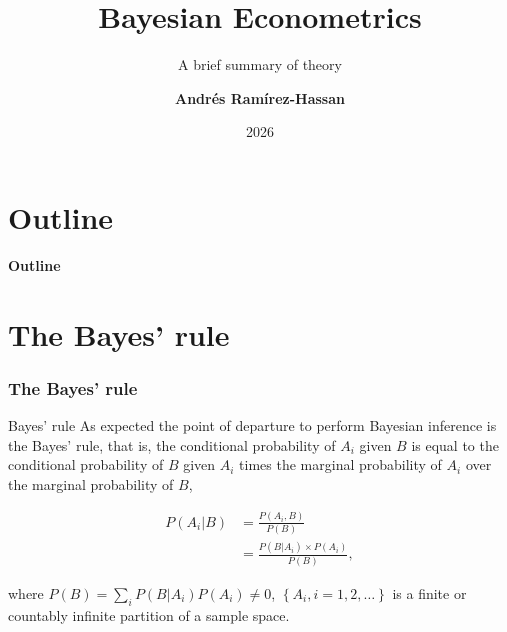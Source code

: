 \documentclass[12pt, compress]{beamer}
\title{Bayesian Econometrics}
\subtitle{A brief summary of theory}
\date{2026}
\author[Andr\'e Ram\'irez H.]{\textbf{Andr\'es Ram\'irez-Hassan}}
\institute[EAFIT]{\small{Universidad EAFIT\\School of Finance, Economics and Government}}
\begin{document}
\maketitle




\section*{Outline}
\begin{frame}
\textbf{\Large{Outline}}
\tableofcontents
\end{frame}

\section{The Bayes' rule}

\begin{frame}
	\frametitle{The Bayes' rule}
	\begin{block}{Bayes' rule}
		As expected the point of departure to perform Bayesian inference is the Bayes' rule, that is, the conditional probability of $A_i$ given $B$ is equal to the conditional probability of $B$ given $A_i$ times the marginal probability of $A_i$ over the marginal probability of $B$,
	\end{block}

	\begin{align}\label{eq1}
	P(A_i|B)&=\frac{P(A_i,B)}{P(B)}\nonumber\\
	&=\frac{P(B|A_i) \times P(A_i)}{P(B)},
	\end{align}
	
	where $P(B)=\sum_i P(B|A_i)P(A_i)\neq 0$, $\left\{A_i, i=1,2,\dots\right\}$ is a finite or countably infinite partition of a sample space.

\end{frame}
\end{document}
